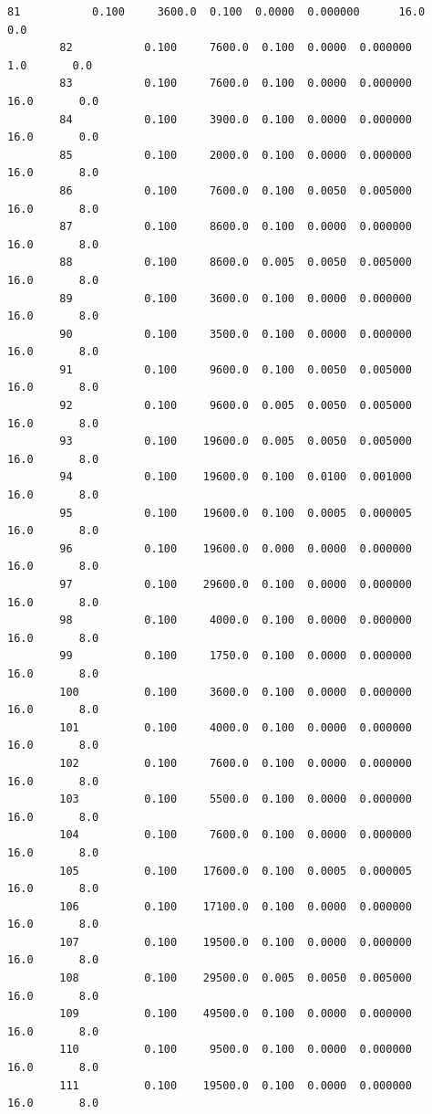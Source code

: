 \documentclass[11pt, a4paper , landscape]{article}
\begin{document}
\begin{Verbatim}[commandchars=\\\{\}]
        81           0.100     3600.0  0.100  0.0000  0.000000      16.0       0.0   
        82           0.100     7600.0  0.100  0.0000  0.000000       1.0       0.0   
        83           0.100     7600.0  0.100  0.0000  0.000000      16.0       0.0   
        84           0.100     3900.0  0.100  0.0000  0.000000      16.0       0.0   
        85           0.100     2000.0  0.100  0.0000  0.000000      16.0       8.0   
        86           0.100     7600.0  0.100  0.0050  0.005000      16.0       8.0   
        87           0.100     8600.0  0.100  0.0000  0.000000      16.0       8.0   
        88           0.100     8600.0  0.005  0.0050  0.005000      16.0       8.0   
        89           0.100     3600.0  0.100  0.0000  0.000000      16.0       8.0   
        90           0.100     3500.0  0.100  0.0000  0.000000      16.0       8.0   
        91           0.100     9600.0  0.100  0.0050  0.005000      16.0       8.0   
        92           0.100     9600.0  0.005  0.0050  0.005000      16.0       8.0   
        93           0.100    19600.0  0.005  0.0050  0.005000      16.0       8.0   
        94           0.100    19600.0  0.100  0.0100  0.001000      16.0       8.0   
        95           0.100    19600.0  0.100  0.0005  0.000005      16.0       8.0   
        96           0.100    19600.0  0.000  0.0000  0.000000      16.0       8.0   
        97           0.100    29600.0  0.100  0.0000  0.000000      16.0       8.0   
        98           0.100     4000.0  0.100  0.0000  0.000000      16.0       8.0   
        99           0.100     1750.0  0.100  0.0000  0.000000      16.0       8.0   
        100          0.100     3600.0  0.100  0.0000  0.000000      16.0       8.0   
        101          0.100     4000.0  0.100  0.0000  0.000000      16.0       8.0   
        102          0.100     7600.0  0.100  0.0000  0.000000      16.0       8.0   
        103          0.100     5500.0  0.100  0.0000  0.000000      16.0       8.0   
        104          0.100     7600.0  0.100  0.0000  0.000000      16.0       8.0   
        105          0.100    17600.0  0.100  0.0005  0.000005      16.0       8.0   
        106          0.100    17100.0  0.100  0.0000  0.000000      16.0       8.0   
        107          0.100    19500.0  0.100  0.0000  0.000000      16.0       8.0   
        108          0.100    29500.0  0.005  0.0050  0.005000      16.0       8.0   
        109          0.100    49500.0  0.100  0.0000  0.000000      16.0       8.0   
        110          0.100     9500.0  0.100  0.0000  0.000000      16.0       8.0   
        111          0.100    19500.0  0.100  0.0000  0.000000      16.0       8.0   

\end{Verbatim}
\end{document}
